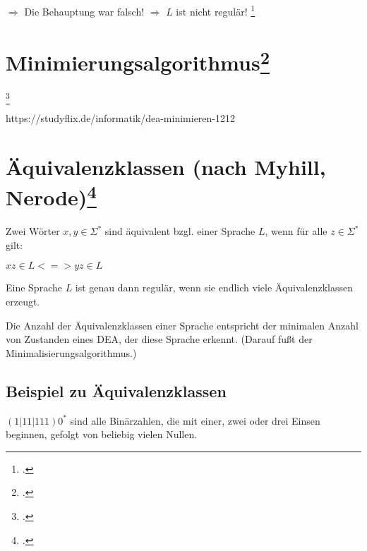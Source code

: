 \documentclass{lehramt-informatik-haupt}
\begin{document}
$\Rightarrow$ Die Behauptung war falsch!
$\Rightarrow$ $L$ ist nicht regulär!
\footcite[Seite 63-64]{theo:fs:1}

%

\section{Minimierungsalgorithmus\footcite[Seite 47-57]{vossen}}

\footcite[Seite 51-62]{theo:fs:1}

https://studyflix.de/informatik/dea-minimieren-1212

%

\section{Äquivalenzklassen (nach Myhill, Nerode)\footcite{theo:fs:}}

Zwei Wörter $x, y \in \Sigma^*$ sind äquivalent bzgl. einer Sprache $L$,
wenn für alle $z \in Σ^*$ gilt:

$xz \in L <=> yz \in L$

Eine Sprache $L$ ist genau dann regulär, wenn sie endlich viele
Äquivalenzklassen erzeugt.

Die Anzahl der Äquivalenzklassen einer Sprache entspricht der
minimalen Anzahl von Zustanden eines DEA, der diese Sprache
erkennt. (Darauf fußt der Minimalisierungsalgorithmus.)

\subsection{Beispiel zu Äquivalenzklassen}

$(1|11|111)0^*$ sind alle Binärzahlen, die mit einer, zwei oder drei
Einsen beginnen, gefolgt von beliebig vielen Nullen.
\end{document}
